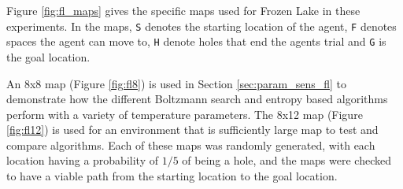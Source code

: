 
            Figure \ref{fig:fl_maps} gives the specific maps used for Frozen Lake in these experiments. In the maps, \texttt{S} denotes the starting location of the agent, \texttt{F} denotes spaces the agent can move to, \texttt{H} denote holes that end the agents trial and \texttt{G} is the goal location. 

            An 8x8 map (Figure \ref{fig:fl8}) is used in Section \ref{sec:param_sens_fl} to demonstrate how the different Boltzmann search and entropy based algorithms perform with a variety of temperature parameters. The 8x12 map (Figure \ref{fig:fl12}) is used for an environment that is sufficiently large map to test and compare algorithms. Each of these maps was randomly generated, with each location having a probability of $1/5$ of being a hole, and the maps were checked to have a viable path from the starting location to the goal location. 
        
